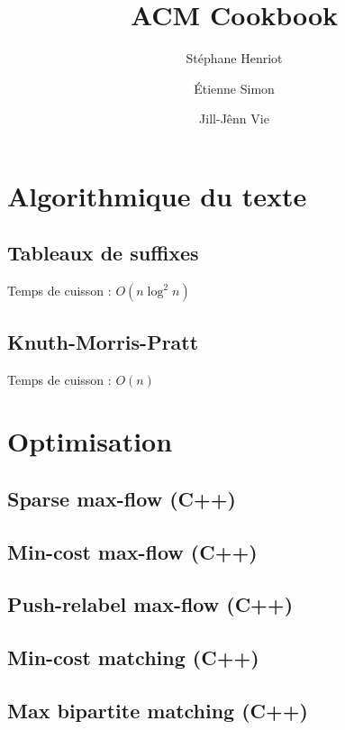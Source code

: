 \documentclass[12pt]{book}
\begin{document}
\title{ACM Cookbook}
\author{Stéphane Henriot \and Étienne Simon \and Jill-Jênn Vie}
\vspace{5cm}
\maketitle
\chapter{Algorithmique du texte}

\section{Tableaux de suffixes}
Temps de cuisson : $O(n \log^2 n)$
{\tiny}

\section{Knuth-Morris-Pratt}
Temps de cuisson : $O(n)$
{\tiny}

\chapter{Optimisation}

\section{Sparse max-flow (C++)}
{\tiny}

\section{Min-cost max-flow (C++)}
{\tiny}

\section{Push-relabel max-flow (C++)}
{\tiny}

\section{Min-cost matching (C++)}
{\tiny}

\section{Max bipartite matching (C++)}
{\tiny}
\end{document}
